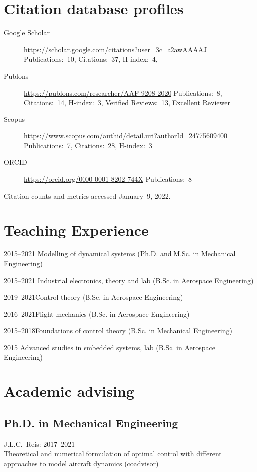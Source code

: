 \documentclass[a4paper, 11pt, oneside]{memoir}
\begin{document}
\section{Citation database profiles}
\begin{description}
\item[Google Scholar] 
  \url{https://scholar.google.com/citations?user=3c_a2awAAAAJ}\newline
  Publications:~10, Citations:~37, H-index:~4,
\item[Publons]
  \url{https://publons.com/researcher/AAF-9208-2020}\newline
  Publications:~8, Citations:~14, H-index:~3, Verified Reviews:~13, 
  Excellent Reviewer
\item[Scopus]
  \url{https://www.scopus.com/authid/detail.uri?authorId=24775609400}\newline
  Publications:~7, Citations:~28, H-index:~3
\item[ORCID]
  \url{https://orcid.org/0000-0001-8202-744X}\newline
  Publications:~8
\end{description}

\noindent
Citation counts and metrics accessed January~9, 2022.

\section{Teaching Experience}
\begin{description}
\item {2015--2021}
{Modelling of dynamical systems (Ph.D. and M.Sc. in Mechanical Engineering)}
\item {2015--2021}
{Industrial electronics, theory and lab (B.Sc. in Aerospace Engineering)}
\item {2019--2021}{Control theory (B.Sc. in Aerospace Engineering)}
\item {2016--2021}{Flight mechanics (B.Sc. in Aerospace Engineering)}
\item {2015--2018}{Foundations of control theory (B.Sc. in Mechanical Engineering)}
\item {2015}
{Advanced studies in embedded systems, lab (B.Sc. in Aerospace Engineering)}
\end{description}

\section{Academic advising}
\subsection{Ph.D. in Mechanical Engineering}
\begin{shortdesc}
\item {\textnormal{J.L.C.~Reis}}:
\hfill 2017--2021\\
Theoretical and numerical formulation of optimal control with different
approaches to model aircraft dynamics (coadvisor)
\end{shortdesc}
\end{document}

